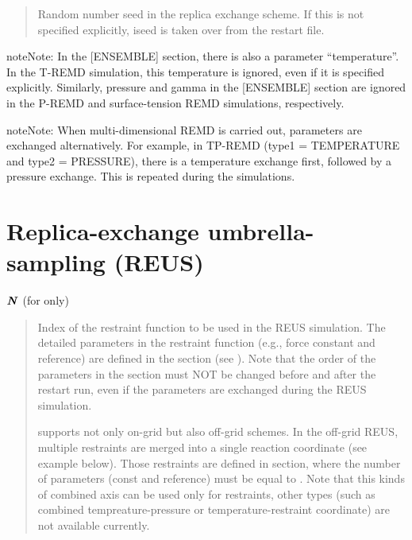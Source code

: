 \documentclass[a4paper,11pt,oneside,english]{sphinxmanual}
\begin{document}
 
\begin{quote}


Random number seed in the replica exchange scheme.
If this is not specified explicitly, iseed is taken over from the restart file.
\end{quote}

\begin{sphinxadmonition}{note}{Note:}
In the {[}ENSEMBLE{]} section, there is also a parameter “temperature”.
In the T-REMD simulation, this temperature is ignored, even if it is specified explicitly.
Similarly, pressure and gamma in the {[}ENSEMBLE{]} section are ignored in the P-REMD
and surface-tension REMD simulations, respectively.
\end{sphinxadmonition}

\begin{sphinxadmonition}{note}{Note:}
When multi-dimensional REMD is carried out, parameters are exchanged alternatively.
For example, in TP-REMD (type1 = TEMPERATURE and type2 = PRESSURE),
there is a temperature exchange first, followed by a pressure exchange.
This is repeated during the simulations.
\end{sphinxadmonition}


\section{Replica-exchange umbrella-sampling (REUS)}
\label{\detokenize{14_REMD:replica-exchange-umbrella-sampling-reus}}
\(\textbf{\textit{N}}\) (for  only)
\begin{quote}

Index of the restraint function to be used in the REUS simulation.
The detailed parameters in the restraint function (e.g., force constant and reference)
are defined in the \sphinxstylestrong{{[}RESTRAINTS{]}} section (see {\hyperref[\detokenize{12_Restraints:restraints}]{}}).
Note that the order of the parameters in the \sphinxstylestrong{{[}RESTRAINTS{]}} section
must NOT be changed before and after the restart run,
even if the parameters are exchanged during the REUS simulation.

 supports not only on-grid but also off-grid schemes.
In the off-grid REUS, multiple restraints are merged into a single reaction coordinate (see example below).
Those restraints are defined in \sphinxstylestrong{{[}RESTRAINTS{]}} section,
where the number of parameters (const and reference) must be equal to .
Note that this kinds of combined axis can be used only for restraints,
other types (such as combined tempreature-pressure or temperature-restraint
coordinate) are not available currently.
\end{quote}
\end{document}
